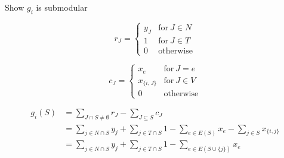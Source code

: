 \documentclass[usenames,dvipsnames]{beamer}
\begin{document}
\begin{frame}{Show $g_i$ is submodular}
  \begin{minipage}{0.49\textwidth}
    \[r_J = \begin{cases} y_J & \text{for}~J \in N\\
      1 & \text{for}~J \in T\\ 0 & \text{otherwise}\end{cases}\]
  \end{minipage}
  \begin{minipage}{0.49\textwidth}
    \[c_J = \begin{cases} x_{e} & \text{for}~J=e \\
      x_{\{i,J\}} & \text{for}~J \in V \\
      0 & \text{otherwise}\end{cases}\]
  \end{minipage}
  \begin{align*}
    g_i(S) &= \sum\limits_{J \cap S \neq \emptyset} r_J - \sum\limits_{J \subseteq S} c_J \\
    &= \sum\limits_{j \in N \cap S} y_j + \sum\limits_{j \in T \cap S} 1 - \sum\limits_{e \in E(S)} x_e - \sum\limits_{j \in S} x_{\{i,j\}} \\
    &= \sum\limits_{j \in N \cap S} y_j + \sum\limits_{j \in T \cap S} 1 - \sum\limits_{e \in E(S \cup \{j\})} x_e
  \end{align*}
\end{frame}

\end{document}
